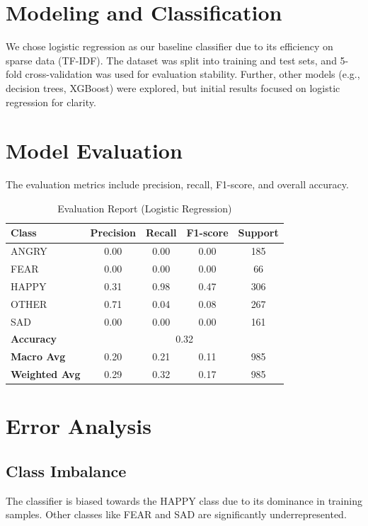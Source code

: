 \documentclass[12pt]{article}
\begin{document}
\section{Modeling and Classification}
We chose logistic regression as our baseline classifier due to its efficiency on sparse data (TF-IDF). The dataset was split into training and test sets, and 5-fold cross-validation was used for evaluation stability. Further, other models (e.g., decision trees, XGBoost) were explored, but initial results focused on logistic regression for clarity.

\section{Model Evaluation}
The evaluation metrics include precision, recall, F1-score, and overall accuracy.

\begin{table}[H]
\centering
\caption{Evaluation Report (Logistic Regression)}
\begin{tabular}{lcccc}
\hline
\textbf{Class} & \textbf{Precision} & \textbf{Recall} & \textbf{F1-score} & \textbf{Support} \\
\hline
ANGRY & 0.00 & 0.00 & 0.00 & 185 \\
FEAR & 0.00 & 0.00 & 0.00 & 66 \\
HAPPY & 0.31 & 0.98 & 0.47 & 306 \\
OTHER & 0.71 & 0.04 & 0.08 & 267 \\
SAD & 0.00 & 0.00 & 0.00 & 161 \\
\hline
\textbf{Accuracy} & \multicolumn{4}{c}{0.32} \\
\textbf{Macro Avg} & 0.20 & 0.21 & 0.11 & 985 \\
\textbf{Weighted Avg} & 0.29 & 0.32 & 0.17 & 985 \\
\hline
\end{tabular}
\end{table}

\section{Error Analysis}
\subsection{Class Imbalance}
The classifier is biased towards the HAPPY class due to its dominance in training samples. Other classes like FEAR and SAD are significantly underrepresented.
\end{document}
